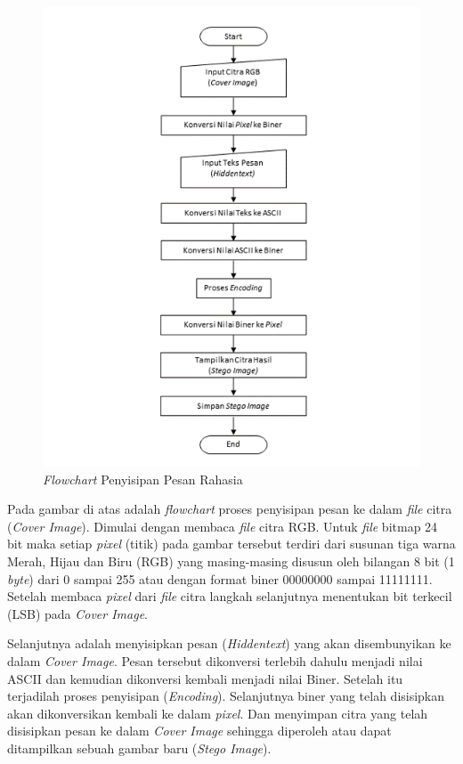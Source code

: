 	\begin{figure}[H]
		\centering
		\includegraphics[width=1\textwidth]{gambar/penyisipan3}
		\caption{\emph{Flowchart} Penyisipan Pesan Rahasia}
		\label{flowchart_penyisipan}
	\end{figure}

	Pada gambar di atas adalah \emph{flowchart} proses penyisipan pesan ke dalam \emph{file}
	citra (\emph{Cover Image}). Dimulai dengan membaca \emph{file} citra RGB. Untuk \emph{file} bitmap 24 bit maka setiap \emph{pixel} (titik) pada gambar tersebut terdiri dari susunan
	tiga warna Merah, Hijau dan Biru (RGB) yang masing-masing disusun oleh bilangan 8 bit
	(1 \emph{byte}) dari 0 sampai 255 atau dengan format biner 00000000 sampai 11111111. Setelah
	membaca \emph{pixel} dari \emph{file} citra langkah selanjutnya menentukan bit terkecil (LSB) pada \emph{Cover Image}.
	
	Selanjutnya adalah menyisipkan pesan (\emph{Hiddentext}) yang akan disembunyikan ke dalam \emph{Cover Image}. Pesan tersebut dikonversi terlebih dahulu menjadi nilai ASCII dan kemudian dikonversi kembali menjadi nilai Biner. Setelah itu terjadilah proses penyisipan (\emph{Encoding}). Selanjutnya biner yang telah disisipkan akan dikonversikan kembali ke dalam \emph{pixel}. Dan menyimpan citra yang telah disisipkan pesan ke dalam \emph{Cover Image} sehingga diperoleh atau	dapat ditampilkan sebuah gambar baru (\emph{Stego Image}).
	
